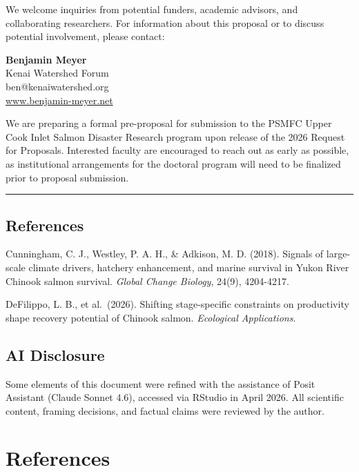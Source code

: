 \documentclass[
  letterpaper,
  DIV=11,
  numbers=noendperiod]{scrreprt}
\begin{document}
We welcome inquiries from potential funders, academic advisors, and
collaborating researchers. For information about this proposal or to
discuss potential involvement, please contact:

\textbf{Benjamin Meyer}\\
Kenai Watershed Forum\\
ben@kenaiwatershed.org\\
\href{https://www.benjamin-meyer.net/}{www.benjamin-meyer.net}

We are preparing a formal pre-proposal for submission to the PSMFC Upper
Cook Inlet Salmon Disaster Research program upon release of the 2026
Request for Proposals. Interested faculty are encouraged to reach out as
early as possible, as institutional arrangements for the doctoral
program will need to be finalized prior to proposal submission.

\begin{center}\rule{0.5\linewidth}{0.5pt}\end{center}

\section{References}\label{references}

Cunningham, C. J., Westley, P. A. H., \& Adkison, M. D. (2018). Signals
of large-scale climate drivers, hatchery enhancement, and marine
survival in Yukon River Chinook salmon survival. \emph{Global Change
Biology}, 24(9), 4204-4217.

DeFilippo, L. B., et al.~(2026). Shifting stage-specific constraints on
productivity shape recovery potential of Chinook salmon.
\emph{Ecological Applications}.

\section{AI Disclosure}\label{ai-disclosure}

Some elements of this document were refined with the assistance of Posit
Assistant (Claude Sonnet 4.6), accessed via RStudio in April 2026. All
scientific content, framing decisions, and factual claims were reviewed
by the author.


\chapter*{References}\label{references-1}


\protect{}\label{refs}
\end{document}
